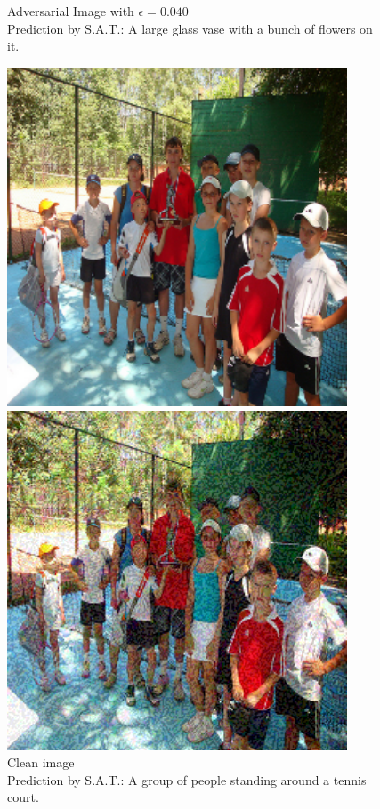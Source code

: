 \begin{figure}[ht]
\begin{minipage}{0.45\textwidth}
        \caption*{Adversarial Image with $\epsilon=0.040$\\Prediction by S.A.T.:  A large glass vase with a bunch of flowers on it.}
    \end{minipage}
\end{figure}

\begin{figure}[ht]
    \centering
    \begin{minipage}{0.45\textwidth}
        \centering
        \includegraphics[width=0.9\textwidth]{figures/fast_method_group_of_people/group_of_people_0.000.png} %
        \caption*{Clean image\\Prediction by S.A.T.: A group of people standing around a tennis court.}
    \end{minipage}\hfill
    \begin{minipage}{0.45\textwidth}
        \centering
        \includegraphics[width=0.9\textwidth]{figures/fast_method_group_of_people/group_of_people_0.080.png} %

\end{minipage}
\end{figure}
